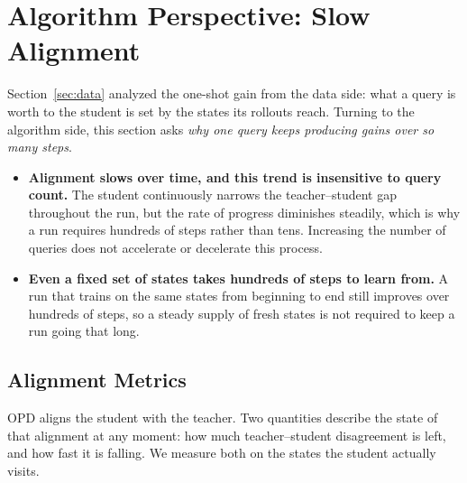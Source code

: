 \section{Algorithm Perspective: Slow Alignment}
\label{sec:algorithm}

Section~\ref{sec:data} analyzed the one-shot gain from the data side: what a query is worth to the student is set by the states its rollouts reach. Turning to the algorithm side, this section asks \textit{why one query keeps producing gains over so many steps}.

\begin{tcolorbox}[takeawaysbox]
\begin{itemize}[topsep=0pt, partopsep=0pt, leftmargin=12pt, itemsep=0pt]
    \item \textbf{Alignment slows over time, and this trend is insensitive to query count.} The student continuously narrows the teacher–student gap throughout the run, but the rate of progress diminishes steadily, which is why a run requires hundreds of steps rather than tens. Increasing the number of queries does not accelerate or decelerate this process.

    \item \textbf{Even a fixed set of states takes hundreds of steps to learn from.}
    A run that trains on the same states from beginning to end still improves over hundreds of steps, so a steady supply of fresh states is not required to keep a run going that long.
\end{itemize}
\end{tcolorbox}

\subsection{Alignment Metrics}
\label{sec:rate-setup}

OPD aligns the student with the teacher. Two quantities describe the state of that alignment at any moment: how much teacher--student disagreement is left, and how fast it is falling. We measure both on the states the student actually visits.


